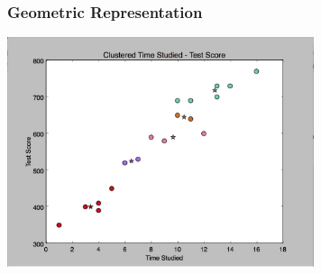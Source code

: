 \documentclass[12pt]{article}
\begin{document}
\subsubsection{Geometric Representation}
\includegraphics[width=90mm]{img/clustered}\\
\end{document}
